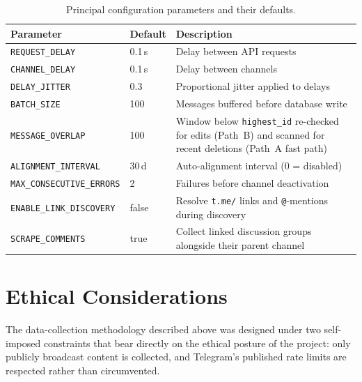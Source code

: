 \begin{table}[htbp]
\centering
\caption{Principal configuration parameters and their defaults.}
\label{tab:config}
\small
\begin{tabular}{@{}llp{6.5cm}@{}}
\toprule
\textbf{Parameter} & \textbf{Default} & \textbf{Description} \\
\midrule
\texttt{REQUEST\_DELAY}     & 0.1\,s & Delay between API requests \\
\texttt{CHANNEL\_DELAY}     & 0.1\,s & Delay between channels \\
\texttt{DELAY\_JITTER}      & 0.3    & Proportional jitter applied to delays \\
\texttt{BATCH\_SIZE}        & 100    & Messages buffered before database write \\
\texttt{MESSAGE\_OVERLAP}   & 100    & Window below \texttt{highest\_id} re-checked for edits (Path~B) and scanned for recent deletions (Path~A fast path) \\
\texttt{ALIGNMENT\_INTERVAL}& 30\,d  & Auto-alignment interval (0 = disabled) \\
\texttt{MAX\_CONSECUTIVE\_ERRORS} & 2 & Failures before channel deactivation \\
\texttt{ENABLE\_LINK\_DISCOVERY} & false & Resolve \texttt{t.me/} links and \texttt{@}-mentions during discovery \\
\texttt{SCRAPE\_COMMENTS}    & true & Collect linked discussion groups alongside their parent channel \\
\bottomrule
\end{tabular}
\end{table}

\section{Ethical Considerations}
\label{sec:ethics}

The data-collection methodology described above was designed under two self-imposed constraints that bear directly on the ethical posture of the project: only publicly broadcast content is collected, and Telegram's published rate limits are respected rather than circumvented.

